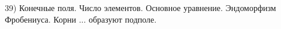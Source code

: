 39) Конечные поля. Число элементов. Основное уравнение. Эндоморфизм Фробениуса. Корни ... образуют подполе.
